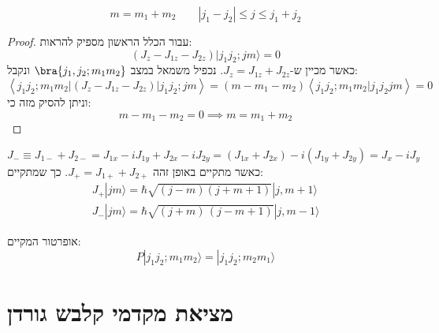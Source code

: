 \documentclass{tstextbook}
\begin{document}
\begin{proposition}
$$m=m_{1}+m_{2} \qquad |j_{1}-j_{2}|\leq j\leq j_{1}+j_{2}$$

\end{proposition}
\begin{proof}
עבור הכלל הראשון מספיק להראות:
$$\left(J_{z}-J_{1z}-J_{2z}\right)|j_{1}j_{2};j m\rangle=0$$
כאשר מכיין ש-\(J_{z}=J_{1z}+J_{2z}\). נכפיל משמאל במצב \(\bra{j_{1},j_{2};m_{1}m_{2}}\) ונקבל:
$$\left\langle j_{1}j_{2};m_{1}m_{2}|\left(J_{z}-J_{1z}-J_{2z}\right)|j_{1}j_{2};j m\right\rangle=\left(m-m_{1}-m_{2}\right)\left\langle j_{1}j_{2};m_{1}m_{2}|j_{1}j_{2}j m\right\rangle=0$$
וניתן להסיק מזה כי:
$$m-m_{1}-m_{2}=0\implies m=m_{1}+m_{2}$$

\end{proof}
\begin{proposition}
$$J_{-}\equiv J_{1-}+J_{2-}=J_{1x}-i J_{1y}+J_{2x}-i J_{2y}=(J_{1x}+J_{2x})-i\left(J_{1y}+J_{2y}\right)=J_{x}-i J_{y}$$
כאשר מתקיים באופן זהה \(J_{+}=J_{1+}+J_{2+}\). כך שמתקיים:
\begin{gather*}J_{+}|j m\rangle=\hbar\sqrt{\left(j-m\right)\left(j+m+1\right)}|j,m+1\rangle\\ J_{-}|j m\rangle=\hbar\sqrt{(j+m)\,(j-m+1)}|j,m-1\rangle 
\end{gather*}

\end{proposition}
\begin{proposition}
אופרטור המקיים:
$$P|j_{1}j_{2};m_{1}m_{2}\rangle=|j_{1}j_{2};m_{2}m_{1}\rangle$$

\end{proposition}
\section{מציאת מקדמי קלבש גורדן}
\end{document}
